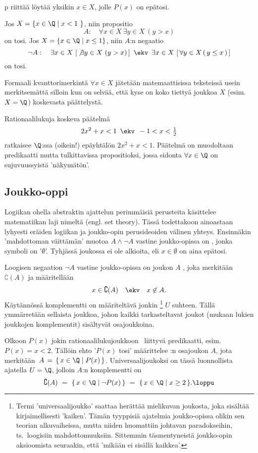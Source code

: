 p riittää löytää yksikin  $ x\in X$, jolle
$P(x)$ on epätosi.
\begin{Exa} Jos $X = \{x \in \Q \mid x < 1\ \}$, niin propositio
\[
A: \quad \forall x \in X\ \exists y \in X\ (y>x)
\]
on tosi. Jos $X = \{x \in \Q \mid x \le 1\}$, niin $A$:n negaatio
\[
\neg A: \quad \exists x \in X\ [\,\not\exists y \in X\ (y>x)\,] \,\ \ekv\,\
              \exists x \in X\ [\,\forall  y\in X\,(\,y \le x\,)\,]
\]
on tosi. \loppu 
\end{Exa}
Formaali kvanttorimerkintä $\forall x \in X$ jätetään matemaattisissa teksteissä usein
merkitsemättä silloin kun on selvää, että kyse on koko tiettyä joukkoa $X$ (esim.\ $X=\Q$)
koskevasta päättelystä.
\begin{Exa} \label{näkymätön kvanttori} Rationaalilukuja koskeva päätelmä
\[
2x^2+x<1\,\ \ekv\,\ -1<x<\tfrac{1}{2}
\]
ratkaisee $\Q$:ssa (oikein!) epäyhtälön $2x^2+x<1$. Päätelmä on muodoltaan predikaatti mutta
tulkittavissa propositioksi, jossa sidonta $\forall x\in\Q$ on sujuvuussyistä 'näkymätön'.
\loppu
\end{Exa} 

\subsection{Joukko-oppi}
%

Logiikan ohella abstraktin ajattelun perimmäisiä perusteita käsittelee matematiikan laji nimeltä
\kor{joukko-oppi} (engl. set theory). Tässä todettakoon ainoastaan lyhyesti eräiden logiikan ja
joukko-opin perusideoiden välinen yhteys. Ensinnäkin 'mahdottoman väittämän' muotoa 
$A \wedge \neg A$ vastine joukko-opissa on
%
, jonka symboli on '$\emptyset$'. 
Tyhjässä joukossa ei ole alkioita, eli $x \in \emptyset$ on aina epätosi. 
 
Loogisen negaation $\neg A$ vastine joukko-opissa on joukon $A$ 
\index{komplementti (joukon)}%
, joka merkitään $\complement(A)$ ja määritellään
\[
x \in \complement(A) \quad \ekv \quad x \not\in A.
\]
Käytännössä komplementti on määriteltävä jonkin
%
\footnote[2]{Termi 
'universaalijoukko' saattaa herättää mielikuvan joukosta, joka sisältää kirjaimellisesti 
'kaiken'. Tämän tyyppisiä ajatelmia joukko-opissa olikin sen teorian alkuvaiheissa, mutta niiden
huomattiin johtavan paradokseihin, ts.\ loogisiin mahdottomuuksiin. Sittemmin täsmentyneistä 
joukko-opin aksioomista seuraakin, että 'mikään ei sisällä kaikkea'.} $U$ suhteen. Tällä
ymmärretään sellaista joukkoa, johon kaikki tarkasteltavat joukot (mukaan lukien joukkojen 
komplementit) sisältyvät osajoukkoina. 
\begin{Exa} Olkoon $P(x)$ jokin rationaalilukujoukkoon \Q\ liittyvä predikaatti, esim.\ 
$P(x) = x<2$. Tällöin ehto '$P(x)$ tosi' määrittelee \Q:n osajoukon $A$, jota merkitään
$\,A\,=\,\{\,x \in \Q \mid P(x)\,\}$. Universaalijoukoksi on tässä luonnollista ajatella
$U=\Q$, jolloin $A$:n komplementti on
\[
\complement(A)\ =\ \{\,x \in \Q \mid \neg P(x)\,\}\ 
                =\ \{\,x \in \Q \mid x \ge 2\,\}. \loppu 
\] \end{Exa}

